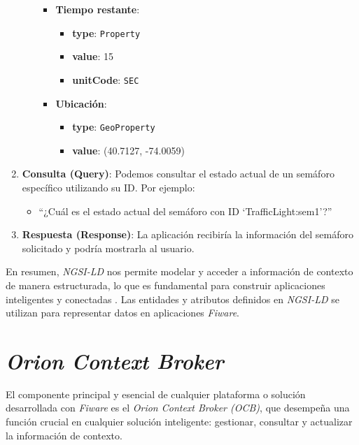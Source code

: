 \begin{enumerate}
\begin{itemize}
\begin{itemize}
\begin{itemize}
                        \end{itemize}
                    \item \textbf{Tiempo restante}: 
                        \begin{itemize}
                            \item \textbf{type}: \texttt{Property}
                            \item \textbf{value}: 15
                            \item \textbf{unitCode}: \texttt{SEC}
                        \end{itemize}
                    \item \textbf{Ubicación}: 
                        \begin{itemize}
                            \item \textbf{type}: \texttt{GeoProperty}
                            \item \textbf{value}: (40.7127, -74.0059)
                        \end{itemize}
                \end{itemize}
        \end{itemize}
    \item \textbf{Consulta (Query)}: Podemos consultar el estado actual de un semáforo específico utilizando su ID. Por ejemplo:
        \begin{itemize}
            \item “¿Cuál es el estado actual del semáforo con ID ‘TrafficLight:sem1’?”
        \end{itemize}
    \item \textbf{Respuesta (Response)}: La aplicación recibiría la información del semáforo solicitado y podría mostrarla al usuario.
\end{enumerate}

En resumen, \textit{NGSI-LD} nos permite modelar y acceder a información de contexto de manera estructurada, lo que es fundamental para construir aplicaciones inteligentes y conectadas \cite{fiware_ngsi_ld}. Las entidades y atributos definidos en \textit{NGSI-LD} se utilizan para representar datos en aplicaciones \textit{Fiware}.


\section{\textit{Orion Context Broker}}\label{orion-context-broker}
El componente principal y esencial de cualquier plataforma o solución desarrollada con \textit{Fiware} es el \textit{Orion Context Broker (OCB)}, que desempeña una función crucial en cualquier solución inteligente: gestionar, consultar y actualizar la información de contexto.

